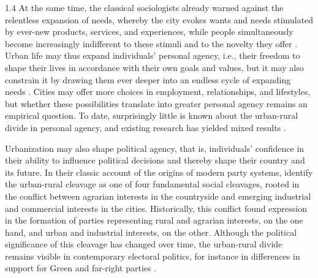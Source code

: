 \documentclass[10pt, letterpaper]{article}
\begin{document}
\begin{spacing}{1.4}
At the same time, the classical sociologists already warned against the
relentless expansion of needs, whereby the city evokes wants and needs
stimulated by ever-new products, services, and experiences, while people
simultaneously become increasingly indifferent to these stimuli and to the
novelty they offer \citep{durkheim2016,simmel1995}. Urban life may thus expand
individuals' personal agency, i.e., their freedom to shape their lives in
accordance with their own goals and values, but it may also constrain it by
drawing them ever deeper into an endless cycle of expanding needs \citep{schwartz04}. 
%
 Cities may offer more choices in employment, relationships, and lifestyles, but whether these possibilities translate into greater personal agency remains an empirical question. To date, surprisingly little is known about the urban-rural divide in personal agency, and existing research has yielded mixed results  \citep[e.g.,][]{atherton2024,kusnali2025,lolle2023differences}.
%

Urbanization may also shape political agency, that is, individuals' confidence in their ability to influence political decisions and thereby shape their country and its future. In their classic account of the origins of modern party systems, \citet{lipsetrokkan1967} identify the urban-rural cleavage as one of four fundamental social cleavages, rooted in the conflict between agrarian interests in the countryside and emerging industrial and commercial interests in the cities. Historically, this conflict found expression in the formation of parties representing rural and agrarian interests, on the one hand, and urban and industrial interests, on the other. Although the political significance of this cleavage has changed over time, the urban-rural divide remains visible in contemporary electoral politics, for instance in differences in support for Green and far-right parties  \citep[e.g.,][]{crulli2024,marksetal2020,rickardsson2021}. 


\end{spacing}
\end{document}
